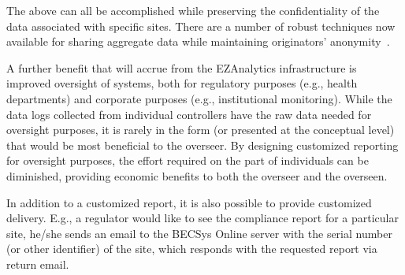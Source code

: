 The above can all be accomplished while preserving the confidentiality
of the data associated with specific sites.  There are a number
of robust techniques now available for sharing aggregate data
while maintaining originators' anonymity~\cite{horey2007,zhong2009k}.

A further benefit that will accrue from the EZAnalytics infrastructure
is improved oversight of systems, both for regulatory purposes
(e.g., health departments) and corporate purposes (e.g., institutional
monitoring).
While the data logs collected from individual controllers have the
raw data needed for oversight purposes, it is rarely in the form
(or presented at the conceptual level) that would be most beneficial
to the overseer.
By designing customized reporting for oversight purposes, the effort
required on the part of individuals can be diminished,
providing economic benefits to both the overseer and the overseen.

In addition to a customized report, it is also possible to provide
customized delivery.  E.g., a regulator would like to see the
compliance report for a particular site, he/she sends an email to
the BECSys Online server with the serial number (or other identifier)
of the site, which responds with the requested report via return email.
